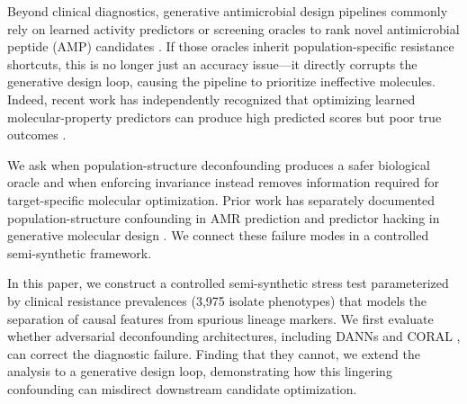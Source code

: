 \documentclass{article}
\begin{document}
Beyond clinical diagnostics, generative antimicrobial design pipelines commonly rely on learned activity predictors or screening oracles to rank novel antimicrobial peptide (AMP) candidates \cite{das2021accelerated, szymczak2023hydramp}. If those oracles inherit population-specific resistance shortcuts, this is no longer just an accuracy issue---it directly corrupts the generative design loop, causing the pipeline to prioritize ineffective molecules. Indeed, recent work has independently recognized that optimizing learned molecular-property predictors can produce high predicted scores but poor true outcomes \cite{gendreau2023assays, yoshizawa2025dyramo}.

We ask when population-structure deconfounding produces a safer biological oracle and when enforcing invariance instead removes information required for target-specific molecular optimization. Prior work has separately documented population-structure confounding in AMR prediction \cite{yu2025population, billows2023mtb} and predictor hacking in generative molecular design \cite{gendreau2023assays, yoshizawa2025dyramo}. We connect these failure modes in a controlled semi-synthetic framework.

In this paper, we construct a controlled semi-synthetic stress test parameterized by clinical resistance prevalences (3,975 isolate phenotypes) that models the separation of causal features from spurious lineage markers. We first evaluate whether adversarial deconfounding architectures, including DANNs and CORAL \cite{sun2016deep}, can correct the diagnostic failure. Finding that they cannot, we extend the analysis to a generative design loop, demonstrating how this lingering confounding can misdirect downstream candidate optimization.
\end{document}
